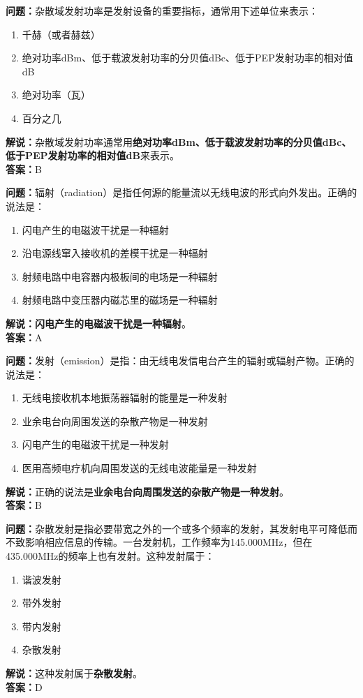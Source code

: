 \documentclass{ctexbook}
\begin{document}
\bigskip


\noindent\textbf{问题：}杂散域发射功率是发射设备的重要指标，通常用下述单位来表示：
\begin{enumerate}[label=\Alph*), leftmargin=3em]
	\item 千赫（或者赫兹）
	\item 绝对功率dBm、低于载波发射功率的分贝值dBc、低于PEP发射功率的相对值dB
	\item 绝对功率（瓦）
	\item 百分之几
\end{enumerate}
\noindent\textbf{解说：}杂散域发射功率通常用\textbf{绝对功率dBm、低于载波发射功率的分贝值dBc、低于PEP发射功率的相对值dB}来表示。\\\noindent\textbf{答案：}B


\bigskip


\noindent\textbf{问题：}辐射（radiation）是指任何源的能量流以无线电波的形式向外发出。正确的说法是：
\begin{enumerate}[label=\Alph*), leftmargin=3em]
	\item 闪电产生的电磁波干扰是一种辐射
	\item 沿电源线窜入接收机的差模干扰是一种辐射
	\item 射频电路中电容器内极板间的电场是一种辐射
	\item 射频电路中变压器内磁芯里的磁场是一种辐射
\end{enumerate}
\textbf{解说：闪电产生的电磁波干扰是一种辐射}。\\\noindent\textbf{答案：}A



\bigskip


\noindent\textbf{问题：}发射（emission）是指：由无线电发信电台产生的辐射或辐射产物。正确的说法是：
\begin{enumerate}[label=\Alph*), leftmargin=3em]
	\item 无线电接收机本地振荡器辐射的能量是一种发射
	\item 业余电台向周围发送的杂散产物是一种发射
	\item 闪电产生的电磁波干扰是一种发射
	\item 医用高频电疗机向周围发送的无线电波能量是一种发射
\end{enumerate}
\noindent\textbf{解说：}正确的说法是\textbf{业余电台向周围发送的杂散产物是一种发射}。\\\noindent\textbf{答案：}B


\bigskip


\noindent\textbf{问题：}杂散发射是指必要带宽之外的一个或多个频率的发射，其发射电平可降低而不致影响相应信息的传输。一台发射机，工作频率为145.000MHz，但在435.000MHz的频率上也有发射。这种发射属于：
\begin{enumerate}[label=\Alph*), leftmargin=3em]
	\item 谐波发射
	\item 带外发射
	\item 带内发射
	\item 杂散发射
\end{enumerate}
\noindent\textbf{解说：}这种发射属于\textbf{杂散发射}。\\\noindent\textbf{答案：}D
\end{document}
